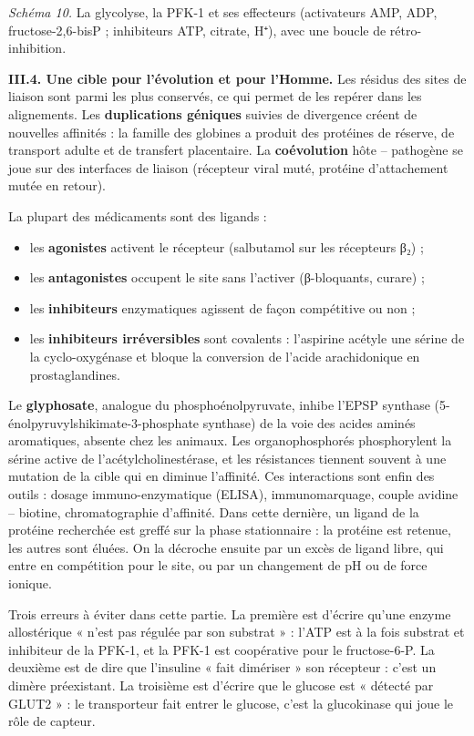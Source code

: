 \documentclass[11pt,a4paper]{article}
\providecommand{\tightlist}{\setlength{\itemsep}{0pt}\setlength{\parskip}{0pt}}
\begin{document}
\emph{Schéma 10.} La glycolyse, la PFK-1 et ses effecteurs (activateurs AMP, ADP, fructose-2,6-bisP ; inhibiteurs ATP, citrate, H⁺), avec une boucle de rétro-inhibition.

\textbf{III.4. Une cible pour l'évolution et pour l'Homme.} Les résidus des sites de liaison sont parmi les plus conservés, ce qui permet de les repérer dans les alignements. Les \textbf{duplications géniques} suivies de divergence créent de nouvelles affinités : la famille des globines a produit des protéines de réserve, de transport adulte et de transfert placentaire. La \textbf{coévolution} hôte -- pathogène se joue sur des interfaces de liaison (récepteur viral muté, protéine d'attachement mutée en retour).

La plupart des médicaments sont des ligands :

\begin{itemize}
\tightlist
\item
  les \textbf{agonistes} activent le récepteur (salbutamol sur les récepteurs β₂) ;
\item
  les \textbf{antagonistes} occupent le site sans l'activer (β-bloquants, curare) ;
\item
  les \textbf{inhibiteurs} enzymatiques agissent de façon compétitive ou non ;
\item
  les \textbf{inhibiteurs irréversibles} sont covalents : l'aspirine acétyle une sérine de la cyclo-oxygénase et bloque la conversion de l'acide arachidonique en prostaglandines.
\end{itemize}

Le \textbf{glyphosate}, analogue du phosphoénolpyruvate, inhibe l'EPSP synthase (5-\allowbreak{}énolpyruvylshikimate-\allowbreak{}3-\allowbreak{}phosphate synthase) de la voie des acides aminés aromatiques, absente chez les animaux. Les organophosphorés phosphorylent la sérine active de l'acétylcholinestérase, et les résistances tiennent souvent à une mutation de la cible qui en diminue l'affinité. Ces interactions sont enfin des outils : dosage immuno-enzymatique (ELISA), immunomarquage, couple avidine -- biotine, chromatographie d'affinité. Dans cette dernière, un ligand de la protéine recherchée est greffé sur la phase stationnaire : la protéine est retenue, les autres sont éluées. On la décroche ensuite par un excès de ligand libre, qui entre en compétition pour le site, ou par un changement de pH ou de force ionique.

\begin{piege}

Trois erreurs à éviter dans cette partie. La première est d'écrire qu'une enzyme allostérique « n'est pas régulée par son substrat » : l'ATP est à la fois substrat et inhibiteur de la PFK-1, et la PFK-1 est coopérative pour le fructose-6-P. La deuxième est de dire que l'insuline « fait dimériser » son récepteur : c'est un dimère préexistant. La troisième est d'écrire que le glucose est « détecté par GLUT2 » : le transporteur fait entrer le glucose, c'est la glucokinase qui joue le rôle de capteur.

\end{piege}
\end{document}

